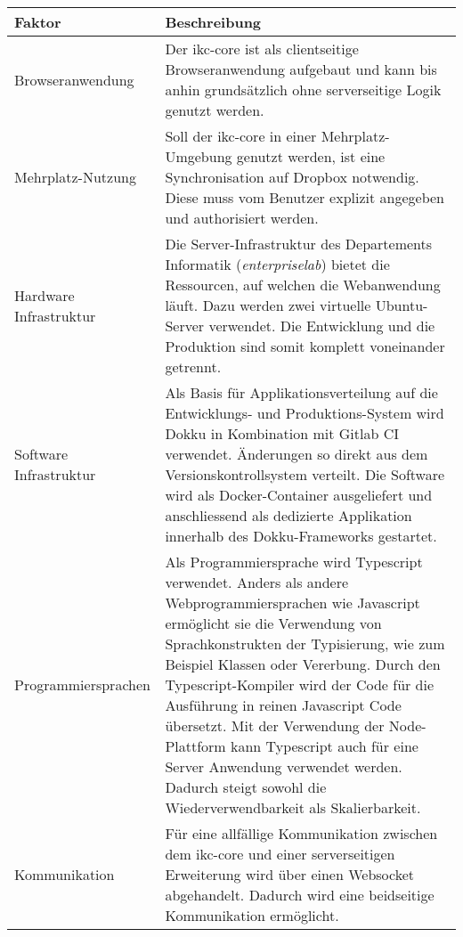 \begin{longtable}{|p{4cm}|p{8.5cm}|}

  \hline
    Faktor &  Beschreibung \\\hline
    Browseranwendung & Der \gls{ikc-core} ist als clientseitige Browseranwendung aufgebaut und kann bis anhin grundsätzlich ohne serverseitige Logik genutzt werden. %
    \\\hline
    Mehrplatz-Nutzung & Soll der \gls{ikc-core} in einer Mehrplatz-Umgebung genutzt werden, ist eine Synchronisation auf \gls{Dropbox} notwendig. Diese muss vom Benutzer explizit angegeben und authorisiert werden.\\\hline
    Hardware Infrastruktur & Die Server-Infrastruktur des Departements Informatik (\textit{enterpriselab}) bietet die Ressourcen, auf welchen die Webanwendung läuft. Dazu werden zwei virtuelle \gls{Ubuntu}-Server verwendet. Die Entwicklung und die Produktion sind somit komplett voneinander getrennt.\\\hline
    
    Software Infrastruktur & Als Basis für Applikationsverteilung auf die Entwicklungs- und Produktions-System wird \gls{Dokku} in Kombination mit \gls{Gitlab CI} verwendet. Änderungen so direkt aus dem Versionskontrollsystem verteilt. Die Software wird als \gls{Docker}-Container ausgeliefert und anschliessend als dedizierte Applikation innerhalb des \gls{Dokku}-Frameworks gestartet.\\\hline
    
    Programmiersprachen & Als Programmiersprache wird \gls{Typescript} verwendet. Anders als andere Webprogrammiersprachen wie \gls{Javascript} ermöglicht sie die Verwendung von Sprachkonstrukten der Typisierung, wie zum Beispiel Klassen oder Vererbung. Durch den Typescript-Kompiler wird der Code für die Ausführung in reinen \gls{Javascript} Code übersetzt. Mit der Verwendung der \gls{Node}-Plattform kann \gls{Typescript} auch für eine Server Anwendung verwendet werden. Dadurch steigt sowohl die Wiederverwendbarkeit als Skalierbarkeit.\\\hline
    
    Kommunikation & Für eine allfällige Kommunikation zwischen dem \gls{ikc-core} und einer serverseitigen Erweiterung wird über einen Websocket abgehandelt. Dadurch wird eine beidseitige Kommunikation ermöglicht. \\\hline
    

\end{longtable}
